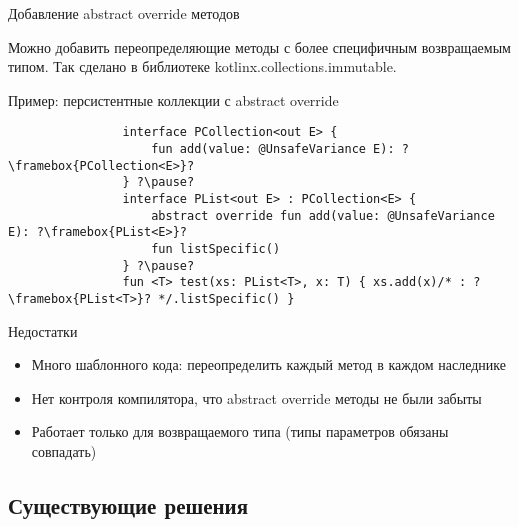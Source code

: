 \documentclass[aspectratio=169,usenames,dvipsnames]{beamer}
\begin{document}
    \begin{frame}[fragile]{Добавление abstract override методов}

        Можно добавить переопределяющие методы с более специфичным возвращаемым типом.
        Так сделано в библиотеке kotlinx.collections.immutable.

        \begin{block}{Пример: персистентные коллекции с abstract override}
            \begin{verbatim}
                interface PCollection<out E> {
                    fun add(value: @UnsafeVariance E): ?\framebox{PCollection<E>}?
                } ?\pause?
                interface PList<out E> : PCollection<E> {
                    abstract override fun add(value: @UnsafeVariance E): ?\framebox{PList<E>}?
                    fun listSpecific()
                } ?\pause?
                fun <T> test(xs: PList<T>, x: T) { xs.add(x)/* : ?\framebox{PList<T>}? */.listSpecific() }
            \end{verbatim}
        \end{block}

        \pause

        \begin{block}{Недостатки}
            \begin{itemize}
                \item Много шаблонного кода: переопределить каждый метод в каждом наследнике
                \item Нет контроля компилятора, что abstract override методы не были забыты
                \item Работает только для возвращаемого типа (типы параметров обязаны совпадать)
            \end{itemize}
        \end{block}
    \end{frame}


    \subsection{Существующие решения}
\end{document}
